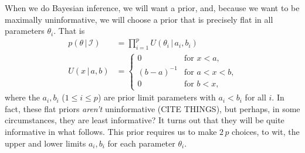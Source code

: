 \documentclass[10pt]{article}
\newcommand{\given}{\,|\,}
\begin{document}
When we do Bayesian inference, we will want a prior, and, because we want to be maximally uninformative, we will choose a prior that is precisely flat in all parameters $\theta_i$.
That is
\begin{align}
    p(\theta\given\mathscr{I}) &= \prod_{i=1}^p U(\theta_i\given a_i, b_i) \\
    U(x\given a, b) & = \left\{\begin{array}{cl}
    0 & \mbox{for $x<a$,} \\
    (b-a)^{-1} & \mbox{for $a<x<b$,} \\
    0 & \mbox{for $b<x$,}\end{array}\right.
\end{align}
where the $a_i, b_i$ ($1\leq i\leq p$) are prior limit parameters with $a_i<b_i$ for all $i$.
In fact, these flat priors \emph{aren't} uninformative (CITE THINGS), but perhaps, in some circumstances, they are least informative?
It turns out that they will be quite informative in what follows.
This prior requires us to make $2\,p$ choices, to wit, the upper and lower limits $a_i, b_i$ for each parameter $\theta_i$.
\end{document}
